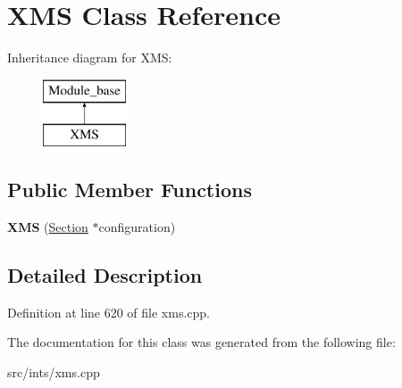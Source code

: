 \hypertarget{classXMS}{\section{X\-M\-S Class Reference}
\label{classXMS}
}
Inheritance diagram for X\-M\-S\-:\begin{figure}[H]
\begin{center}
\leavevmode
\includegraphics[height=2.000000cm]{classXMS}
\end{center}
\end{figure}
\subsection*{Public Member Functions}
\begin{DoxyCompactItemize}
\item 
\hypertarget{classXMS_a09c1f705bac7231151e025c1444f8c2c}{{\bfseries X\-M\-S} (\hyperlink{classSection}{Section} $\ast$configuration)}\label{classXMS_a09c1f705bac7231151e025c1444f8c2c}

\end{DoxyCompactItemize}


\subsection{Detailed Description}


Definition at line 620 of file xms.\-cpp.



The documentation for this class was generated from the following file\-:\begin{DoxyCompactItemize}
\item 
src/ints/xms.\-cpp\end{DoxyCompactItemize}
